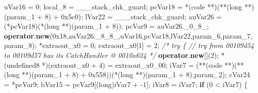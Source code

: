 \documentclass[
]{article}
\newenvironment{Shaded}{}{}
\newcommand{\BaseNTok}[1]{\textcolor[rgb]{0.25,0.63,0.44}{#1}}
\newcommand{\CommentTok}[1]{\textcolor[rgb]{0.38,0.63,0.69}{\textit{#1}}}
\newcommand{\ControlFlowTok}[1]{\textcolor[rgb]{0.00,0.44,0.13}{\textbf{#1}}}
\newcommand{\DataTypeTok}[1]{\textcolor[rgb]{0.56,0.13,0.00}{#1}}
\newcommand{\DecValTok}[1]{\textcolor[rgb]{0.25,0.63,0.44}{#1}}
\newcommand{\KeywordTok}[1]{\textcolor[rgb]{0.00,0.44,0.13}{\textbf{#1}}}
\newcommand{\NormalTok}[1]{#1}
\newcommand{\OperatorTok}[1]{\textcolor[rgb]{0.40,0.40,0.40}{#1}}
\begin{document}
\begin{Shaded}
\begin{Highlighting}[]
\NormalTok{  uVar16 }\OperatorTok{=} \DecValTok{0}\OperatorTok{;}
\NormalTok{  local\_8 }\OperatorTok{=}\NormalTok{ \_\_\_stack\_chk\_guard}\OperatorTok{;}
\NormalTok{  pcVar18 }\OperatorTok{=} \OperatorTok{*(}\NormalTok{code }\OperatorTok{**)(**(}\DataTypeTok{long} \OperatorTok{**)(}\NormalTok{param\_1 }\OperatorTok{+} \DecValTok{8}\OperatorTok{)} \OperatorTok{+} \BaseNTok{0x5c0}\OperatorTok{);}
\NormalTok{  lVar22 }\OperatorTok{=}\NormalTok{ \_\_\_stack\_chk\_guard}\OperatorTok{;}
\NormalTok{  auVar26 }\OperatorTok{=} \OperatorTok{(*}\NormalTok{pcVar18}\OperatorTok{)(*(}\DataTypeTok{long} \OperatorTok{**)(}\NormalTok{param\_1 }\OperatorTok{+} \DecValTok{8}\OperatorTok{));}
\NormalTok{  pcVar9 }\OperatorTok{=}\NormalTok{ auVar26}\OperatorTok{.}\NormalTok{\_0\_8\_}\OperatorTok{;}
  \KeywordTok{operator}\OperatorTok{.}\KeywordTok{new}\OperatorTok{(}\BaseNTok{0x18}\OperatorTok{,}\NormalTok{auVar26}\OperatorTok{.}\NormalTok{\_8\_8\_}\OperatorTok{,}\NormalTok{uVar16}\OperatorTok{,}\NormalTok{pcVar18}\OperatorTok{,}\NormalTok{lVar22}\OperatorTok{,}\NormalTok{param\_6}\OperatorTok{,}\NormalTok{param\_7}\OperatorTok{,}\NormalTok{param\_8}\OperatorTok{);}
  \OperatorTok{*}\NormalTok{extraout\_x0 }\OperatorTok{=} \DecValTok{0}\OperatorTok{;}
\NormalTok{  extraout\_x0}\OperatorTok{[}\DecValTok{1}\OperatorTok{]} \OperatorTok{=} \DecValTok{2}\OperatorTok{;}
                    \CommentTok{/* try \{ // try from 00109d54 to 00109d57 has its CatchHandler @ 0010a624 */}
  \KeywordTok{operator}\OperatorTok{.}\KeywordTok{new}\OperatorTok{[](}\DecValTok{2}\OperatorTok{);}
  \OperatorTok{*(}\NormalTok{undefined8 }\OperatorTok{*)(}\NormalTok{extraout\_x0 }\OperatorTok{+} \DecValTok{4}\OperatorTok{)} \OperatorTok{=}\NormalTok{ extraout\_x0\_00}\OperatorTok{;}
\NormalTok{  iVar7 }\OperatorTok{=} \OperatorTok{(**(}\NormalTok{code }\OperatorTok{**)(**(}\DataTypeTok{long} \OperatorTok{**)(}\NormalTok{param\_1 }\OperatorTok{+} \DecValTok{8}\OperatorTok{)} \OperatorTok{+} \BaseNTok{0x558}\OperatorTok{))(*(}\DataTypeTok{long} \OperatorTok{**)(}\NormalTok{param\_1 }\OperatorTok{+} \DecValTok{8}\OperatorTok{),}\NormalTok{param\_2}\OperatorTok{);}
\NormalTok{  cVar24 }\OperatorTok{=} \OperatorTok{*}\NormalTok{pcVar9}\OperatorTok{;}
\NormalTok{  bVar15 }\OperatorTok{=}\NormalTok{ pcVar9}\OperatorTok{[(}\DataTypeTok{long}\OperatorTok{)}\NormalTok{iVar7 }\OperatorTok{+} \OperatorTok{{-}}\DecValTok{1}\OperatorTok{];}
\NormalTok{  iVar8 }\OperatorTok{=}\NormalTok{ iVar7}\OperatorTok{;}
  \ControlFlowTok{if} \OperatorTok{(}\DecValTok{0} \OperatorTok{\textless{}}\NormalTok{ iVar7}\OperatorTok{)} \OperatorTok{\{}

\end{Highlighting}
\end{Shaded}
\end{document}
